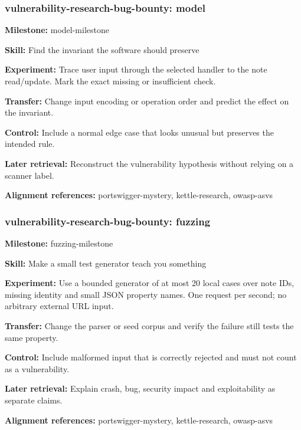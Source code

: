 \subsubsection{vulnerability-research-bug-bounty: model}
\noindent\textbf{Milestone:} model-milestone\par
\noindent\textbf{Skill:} Find the invariant the software should preserve\par
\noindent\textbf{Experiment:} Trace user input through the selected handler to the note read/update. Mark the exact missing or insufficient check.\par
\noindent\textbf{Transfer:} Change input encoding or operation order and predict the effect on the invariant.\par
\noindent\textbf{Control:} Include a normal edge case that looks unusual but preserves the intended rule.\par
\noindent\textbf{Later retrieval:} Reconstruct the vulnerability hypothesis without relying on a scanner label.\par
\noindent\textbf{Alignment references:} portswigger-mystery, kettle-research, owasp-asvs\par
\subsubsection{vulnerability-research-bug-bounty: fuzzing}
\noindent\textbf{Milestone:} fuzzing-milestone\par
\noindent\textbf{Skill:} Make a small test generator teach you something\par
\noindent\textbf{Experiment:} Use a bounded generator of at most 20 local cases over note IDs, missing identity and small JSON property names. One request per second; no arbitrary external URL input.\par
\noindent\textbf{Transfer:} Change the parser or seed corpus and verify the failure still tests the same property.\par
\noindent\textbf{Control:} Include malformed input that is correctly rejected and must not count as a vulnerability.\par
\noindent\textbf{Later retrieval:} Explain crash, bug, security impact and exploitability as separate claims.\par
\noindent\textbf{Alignment references:} portswigger-mystery, kettle-research, owasp-asvs\par
